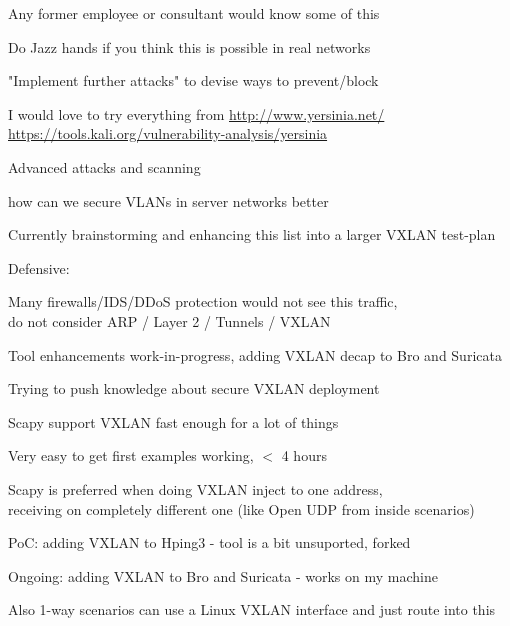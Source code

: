 \documentclass[Screen16to9,17pt,footrule]{foils}
\begin{document}
\vskip 1cm
Any former employee or consultant would know some of this

Do Jazz hands if you think this is possible in real networks




\begin{list2}
\item "Implement further attacks" to devise ways to prevent/block
\item I would love to try everything from  \url{http://www.yersinia.net/}\\ \url{https://tools.kali.org/vulnerability-analysis/yersinia}
\item Advanced attacks and scanning
\item how can we secure VLANs in server networks better
\item Currently brainstorming and enhancing this list into a larger VXLAN test-plan
\end{list2}



Defensive:
\begin{list2}
\item Many firewalls/IDS/DDoS protection would not see this traffic,\\
do not consider ARP / Layer 2 / Tunnels / VXLAN
\item Tool enhancements work-in-progress, adding VXLAN decap to Bro and Suricata
\item Trying to push knowledge about secure VXLAN deployment
\end{list2}


\begin{list2}
\item Scapy support VXLAN fast enough for a lot of things
\item Very easy to get first examples working, $<$ 4 hours
\item Scapy is preferred when doing VXLAN inject to one address, \\
receiving on completely different one (like Open UDP from inside scenarios)
\item PoC: adding VXLAN to Hping3 - tool is a bit unsuported, forked
\item Ongoing: adding VXLAN to Bro and Suricata - works on my machine
\vskip 1cm
\item Also 1-way scenarios can use a Linux VXLAN interface and just route into this
\end{list2}
\end{document}
